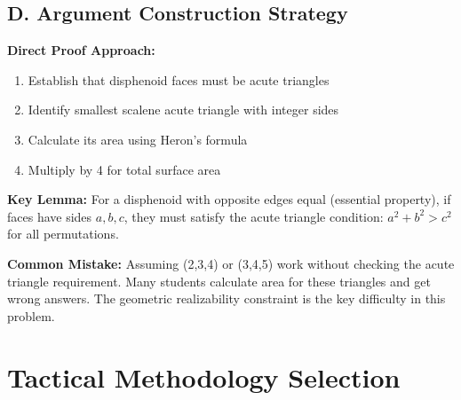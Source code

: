 \documentclass[12pt]{article}
\begin{document}
\begin{strategicbox}
\subsection*{D. Argument Construction Strategy}

\textbf{Direct Proof Approach:}
\begin{enumerate}
    \item Establish that disphenoid faces must be acute triangles
    \item Identify smallest scalene acute triangle with integer sides
    \item Calculate its area using Heron's formula
    \item Multiply by 4 for total surface area
\end{enumerate}

\textbf{Key Lemma:} For a disphenoid with opposite edges equal (essential property), if faces have sides $a, b, c$, they must satisfy the acute triangle condition: $a^2 + b^2 > c^2$ for all permutations.

\end{strategicbox}

\begin{warningbox}
\textbf{Common Mistake:} Assuming (2,3,4) or (3,4,5) work without checking the acute triangle requirement. Many students calculate area for these triangles and get wrong answers. The geometric realizability constraint is the key difficulty in this problem.
\end{warningbox}

\section{Tactical Methodology Selection}
\end{document}
